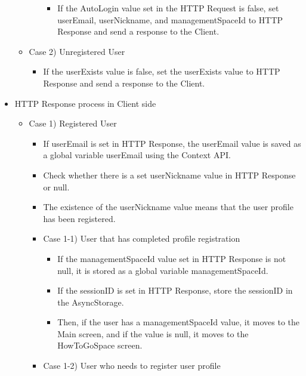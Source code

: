 \documentclass[conference]{IEEEtran}
\begin{document}
\begin{itemize}
\begin{itemize}
\begin{itemize}
\begin{itemize}
                \item If the AutoLogin value set in the HTTP Request is false, set userEmail, userNickname, and managementSpaceId to HTTP Response and send a response to the Client.
            \end{itemize}
        \end{itemize}
    \end{itemize}
    \begin{itemize}
        \item Case 2) Unregistered User
        \begin{itemize}
            \item If the userExists value is false, set the userExists value to HTTP Response and send a response to the Client.
            \\
        \end{itemize}
    \end{itemize}
    \item HTTP Response process in Client side
    \begin{itemize}
        \item Case 1) Registered User
        \begin{itemize}
            \item If userEmail is set in HTTP Response, the userEmail value is saved as a global variable userEmail using the Context API.
            \item Check whether there is a set userNickname value in HTTP Response or null.
            \item The existence of the userNickname value means that the user profile has been registered.
            \item Case 1-1) User that has completed profile registration
            \begin{itemize}
                \item If the managementSpaceId value set in HTTP Response is not null, it is stored as a global variable managementSpaceId.
                \item If the sessionID is set in HTTP Response, store the sessionID in the  AsyncStorage.
                \item Then, if the user has a managementSpaceId value, it moves to the Main screen, and if the value is null, it moves to the HowToGoSpace screen.
            \end{itemize}
            \item Case 1-2) User who needs to register user profile
            \begin{itemize}

\end{itemize}
\end{itemize}
\end{itemize}
\end{itemize}
\end{document}

